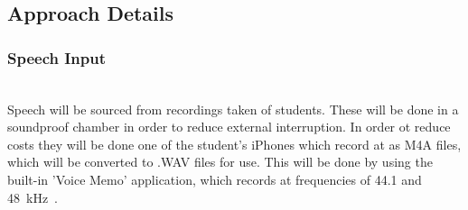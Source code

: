 \documentclass[10pt,twocolumn]{witseiepaper}
\begin{document}
\subsection{Approach Details}
\subsubsection{Speech Input} \hfill\\
Speech will be sourced from recordings taken of students. These will be done in a soundproof chamber in order to reduce external interruption. In order ot reduce costs they will be done one of the student's iPhones which record at as M4A files, which will be converted to .WAV files for use. This will be done by using the built-in 'Voice Memo' application, which records at frequencies of 44.1 and 48~kHz~\cite{recordingFreq}.
\end{document}
